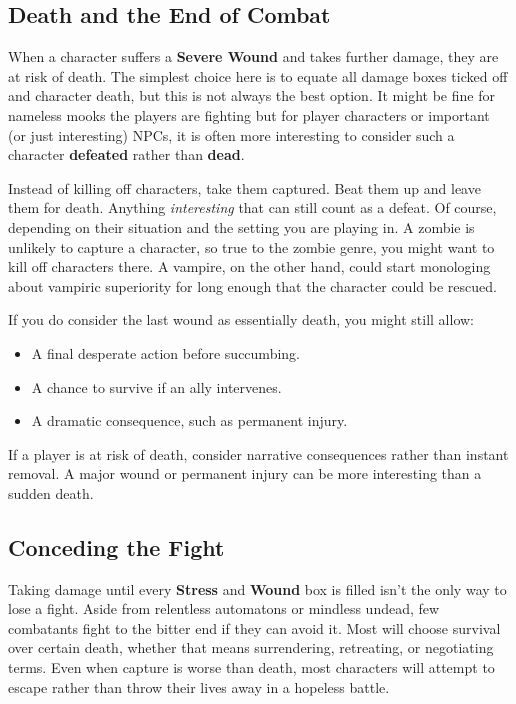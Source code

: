 \begin{multicols}{2}
\subsection{Death and the End of Combat}\label{core:death}
When a character suffers a \textbf{Severe Wound} and takes further damage, they are at risk of death. The simplest choice here is to equate all damage boxes ticked off and character death, but this is not always the best option. It might be fine for nameless mooks the players are fighting but for player characters or important (or just interesting) NPCs, it is often more interesting to consider such a character \textbf{defeated} rather than \textbf{dead}.

Instead of killing off characters, take them captured. Beat them up and leave them for death. Anything \emph{interesting} that can still count as a defeat. Of course, depending on their situation and the setting you are playing in. A zombie is unlikely to capture a character, so true to the zombie genre, you might want to kill off characters there. A vampire, on the other hand, could start monologing about vampiric superiority for long enough that the character could be rescued. 

If you do consider the last wound as essentially death, you might still allow:
\begin{itemize}
    \item A final desperate action before succumbing.
    \item A chance to survive if an ally intervenes.
    \item A dramatic consequence, such as permanent injury.
\end{itemize}

\begin{GmTips}
	If a player is at risk of death, consider narrative consequences rather than instant removal. A major wound or permanent injury can be more interesting than a sudden death.
\end{GmTips}


\subsection{Conceding the Fight}\label{core:conceding}

Taking damage until every \textbf{Stress} and \textbf{Wound} box is filled isn’t the only way to lose a fight. Aside from relentless automatons or mindless undead, few combatants fight to the bitter end if they can avoid it. Most will choose survival over certain death, whether that means surrendering, retreating, or negotiating terms. Even when capture is worse than death, most characters will attempt to escape rather than throw their lives away in a hopeless battle.


\end{multicols}
